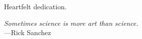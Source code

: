 %
\begin{frontmatter}

%
%
\makefrontmatter

%
%
%
%
%
%
\begin{dedication}
  Heartfelt dedication. 
\end{dedication}


%
%



%
%
\begin{epigraph} %
  \emph{Sometimes science is more art than science.}\\
  ---Rick Sanchez
\end{epigraph}

%


%
\tableofcontents
\listoffigures  %
\listoftables   %




\end{frontmatter}
